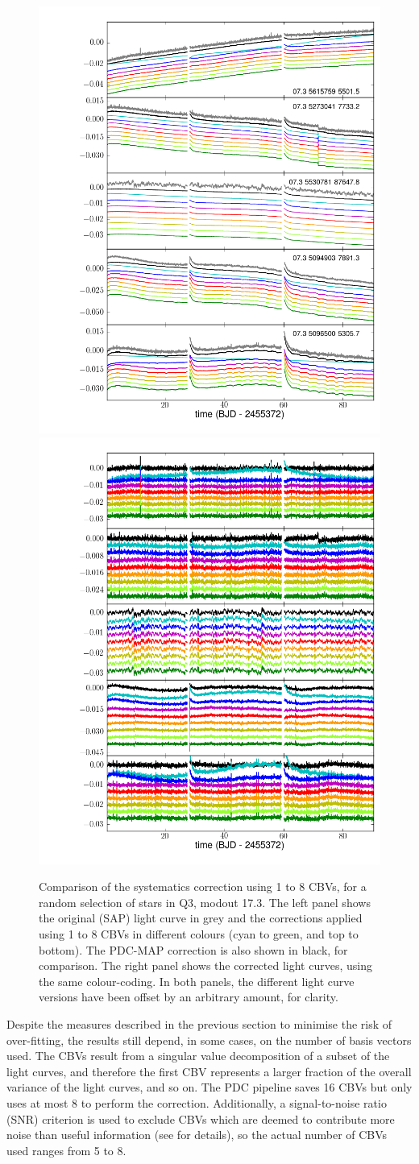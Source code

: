 \documentclass[useAMS,usenatbib]{mn2e}
\begin{document}
\begin{figure}
  \centering
  \includegraphics[width=0.49\linewidth]{q6_mod07_out3_cbv_examples_diff.png}
  \includegraphics[width=0.49\linewidth]{q6_mod07_out3_cbv_examples.png}
  \caption{Comparison of the systematics correction using 1 to 8 CBVs,
    for a random selection of stars in Q3, modout 17.3. The left panel
    shows the original (SAP) light curve in grey and the corrections
    applied using 1 to 8 CBVs in different colours (cyan to green, and
    top to bottom). The PDC-MAP correction is also shown in black, for
    comparison. The right panel shows the corrected light curves,
    using the same colour-coding. In both panels, the different light
    curve versions have been offset by an arbitrary amount, for
    clarity.}
  \label{fig:ncbv_ex}
\end{figure}

Despite the measures described in the previous section to minimise the
risk of over-fitting, the results still depend, in some cases, on the number of basis vectors
used. The CBVs result from a singular value decomposition of a
subset of the light curves, and therefore the first CBV represents a
larger fraction of the overall variance of the light curves, and so
on. The PDC pipeline saves 16 CBVs but only uses at most 8 to
perform the correction. Additionally, a signal-to-noise ratio (SNR)
criterion is used to exclude CBVs which are deemed to contribute more
noise than useful information (see \citealt{smi+12} for details), so
the actual number of CBVs used ranges from 5 to 8. 
\end{document}
